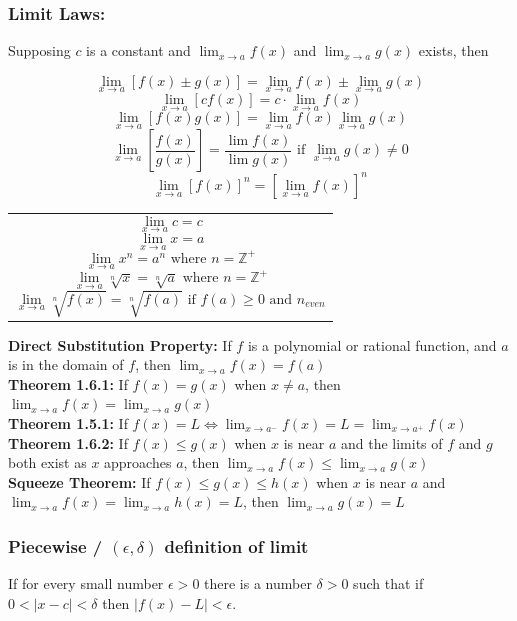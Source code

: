\documentclass[12pt]{article}
\begin{document}
\subsubsection{Limit Laws:}
Supposing $c$ is a constant and $\lim_{x \to a}f(x)$ and $\lim_{x \to a}g(x)$ exists, then\\
\begin{minipage}{0.5\textwidth}
    $$\lim_{x \to a} [f(x) \pm g(x)] = \lim_{x \to a} f(x) \pm \lim_{x \to a} g(x)$$
    $$\lim_{x \to a} [cf(x)] = c \cdot \lim_{x \to a} f(x)$$
    $$\lim_{x \to a} [f(x)g(x)] = \lim_{x \to a} f(x) \lim_{x \to a} g(x)$$
    $$\lim_{x \to a} \left [ \frac{f(x)}{g(x)} \right ] = \frac{\lim f(x)}{\lim g(x)} \text{ if } \lim_{x \to a} g(x) \neq{} 0$$
    $$\lim_{x \to a} [f(x)]^n = [\lim_{x \to a} f(x)]^n$$

\hfill
\end{minipage}
\begin{minipage}{0.45\textwidth}
\begin{tabular}{|p{\textwidth}}
$$\lim_{x \to a} c = c$$
$$\lim_{x \to a} x = a$$
$$\lim_{x \to a} x^n = a^n \text{ where } n = \mathbb{Z}^+$$ 
$$\lim_{x \to a} \sqrt[n]{x} = \sqrt[n]{a} \text{ where } n = \mathbb{Z}^+$$ 
$$\lim_{x \to a} \sqrt[n]{f(x)} = \sqrt[n]{f(a)} \text{ if } f(a) \geq 0 \text{ and } n_{even}$$
\end{tabular}
\end{minipage}

\noindent\textbf{Direct Substitution Property:} If $f$ is a polynomial or rational function, and $a$ is in the domain of $f$, then $\lim_{x \to a} f(x) = f(a)$\\
\textbf{Theorem 1.6.1:} If $f(x) = g(x)$ when $x \neq a$, then $\lim_{x\to a} f(x) = \lim_{x\to a} g(x)$ \\
\textbf{Theorem 1.5.1:} If $f(x) = L \iff \lim_{x\to a^-} f(x) = L = \lim_{x\to a^+} f(x)$\\
\textbf{Theorem 1.6.2:} If $f(x) \leq g(x)$ when $x$ is near $a$ and the limits of $f$ and $g$ both exist as $x$ approaches $a$, then $\lim_{x\to a} f(x) \leq \lim_{x\to a} g(x)$\\
\textbf{Squeeze Theorem:} If $f(x) \leq g(x) \leq h(x)$ when $x$ is near $a$ and 
 $\lim_{x\to a} f(x) =  \lim_{x\to a} h(x) = L$, then $\lim_{x\to a} g(x) = L$


\subsubsection{Piecewise / $(\epsilon, \delta)$ definition  of limit}
If for every small number $\epsilon >  0$ there is a number $\delta > 0$ such that if $0 < |x-c| < \delta$ then $|f(x) - L| < \epsilon$.
\end{document}
